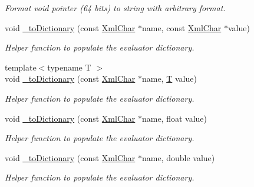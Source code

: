 \begin{DoxyCompactItemize}
\begin{DoxyCompactList}\small\item\em Format void pointer (64 bits) to string with arbitrary format. \item\end{DoxyCompactList}\item 
void \hyperlink{group___d_d4_h_e_p___x_m_l_ga453206d36ab8257b39337846e5a1795d}{\_\-toDictionary} (const \hyperlink{namespace_d_d4hep_1_1_x_m_l_a09e5d9cc86ed782f6826dfe0778c1815}{XmlChar} $\ast$name, const \hyperlink{namespace_d_d4hep_1_1_x_m_l_a09e5d9cc86ed782f6826dfe0778c1815}{XmlChar} $\ast$value)
\begin{DoxyCompactList}\small\item\em Helper function to populate the evaluator dictionary. \item\end{DoxyCompactList}\item 
{\footnotesize template$<$typename T $>$ }\\void \hyperlink{group___d_d4_h_e_p___x_m_l_ga45b176504b155d5f47b9c7cfdc5a9255}{\_\-toDictionary} (const \hyperlink{namespace_d_d4hep_1_1_x_m_l_a09e5d9cc86ed782f6826dfe0778c1815}{XmlChar} $\ast$name, \hyperlink{class_t}{T} value)
\begin{DoxyCompactList}\small\item\em Helper function to populate the evaluator dictionary. \item\end{DoxyCompactList}\item 
void \hyperlink{group___d_d4_h_e_p___x_m_l_gac7be63582e2bd7ad2bad66544cb45ede}{\_\-toDictionary} (const \hyperlink{namespace_d_d4hep_1_1_x_m_l_a09e5d9cc86ed782f6826dfe0778c1815}{XmlChar} $\ast$name, float value)
\begin{DoxyCompactList}\small\item\em Helper function to populate the evaluator dictionary. \item\end{DoxyCompactList}\item 
void \hyperlink{group___d_d4_h_e_p___x_m_l_ga7a346eee87fe45320da3ebb2e1958af5}{\_\-toDictionary} (const \hyperlink{namespace_d_d4hep_1_1_x_m_l_a09e5d9cc86ed782f6826dfe0778c1815}{XmlChar} $\ast$name, double value)
\begin{DoxyCompactList}\small\item\em Helper function to populate the evaluator dictionary. \item\end{DoxyCompactList}\item 

\end{DoxyCompactItemize}
